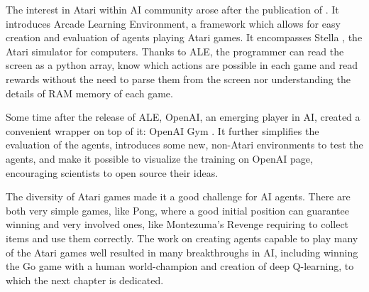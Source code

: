 The interest in Atari within AI community arose after the publication of \cite{ale}. It introduces Arcade Learning Environment, a framework which allows for easy creation and evaluation of agents playing Atari games. It encompasses Stella \cite{stella}, the Atari simulator for computers. Thanks to ALE, the programmer can read the screen as a python array, know which actions are possible in each game and read rewards without the need to parse them from the screen nor understanding the details of RAM memory of each game.

Some time after the release of ALE, OpenAI, an emerging player in AI, created a convenient wrapper on top of it: OpenAI Gym \cite{gym}. It further simplifies the evaluation of the agents, introduces some new, non-Atari environments to test the agents, and make it possible to visualize the training on OpenAI page, encouraging scientists to open source their ideas.

The diversity of Atari games made it a good challenge for AI agents. There are both very simple games, like Pong, where a good initial position can guarantee winning and very involved ones, like Montezuma's Revenge  requiring to collect items and use them correctly. The work on creating agents capable to play many of the Atari games well resulted in many breakthroughs in AI, including winning the Go game with a human world-champion \cite{alphago} and creation of deep Q-learning, to which the next chapter is dedicated.
